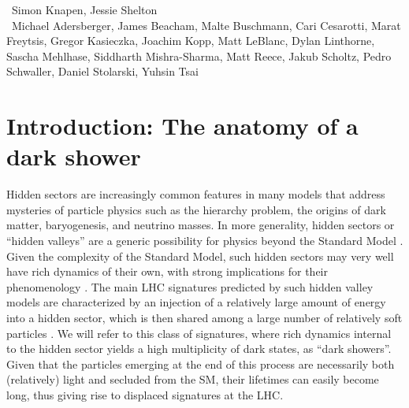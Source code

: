~Simon Knapen, Jessie Shelton
\\


~Michael Adersberger, James Beacham, Malte Buschmann, Cari Cesarotti, Marat Freytsis, Gregor Kasieczka, Joachim Kopp, Matt LeBlanc, Dylan Linthorne,  Sascha Mehlhase, Siddharth Mishra-Sharma, Matt Reece, Jakub Scholtz, Pedro Schwaller, Daniel Stolarski, Yuhsin Tsai

\section{Introduction: The anatomy of a dark shower}
\label{sec:darkshowerintro}

Hidden sectors are increasingly common features in many models that address mysteries of particle physics such as the hierarchy problem, the origins of dark matter, baryogenesis, and neutrino masses.  In more generality, hidden sectors or ``hidden valleys'' are a generic possibility for physics beyond the Standard Model \cite{Strassler:2006im,Han:2007ae}.  Given the complexity of the Standard Model, such hidden sectors may very well have rich dynamics of their own, with strong implications for their phenomenology \cite{Strassler:2006ri,Strassler:2006qa,Strassler:2008bv,Strassler:2008fv,Juknevich:2009ji}. 
The main LHC signatures predicted by such hidden valley models are characterized by an injection of a relatively large amount of energy into a hidden sector, which is then shared among a large number of relatively soft particles \cite{Strassler:2008bv}. We will refer to this class of signatures, where rich dynamics internal to the hidden sector yields a high multiplicity of dark states, as ``dark showers''.
Given that the particles emerging at the end of this process are necessarily both (relatively) light and secluded from the SM, their lifetimes can easily become long, thus giving rise to displaced signatures at the LHC.

